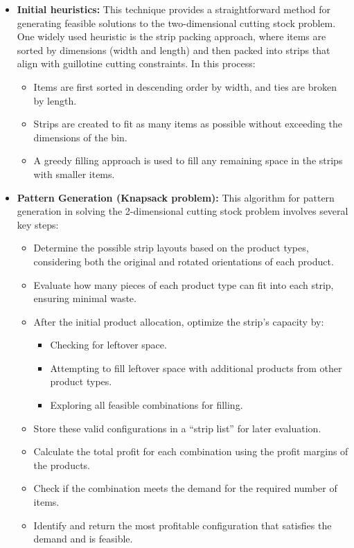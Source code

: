 \documentclass[a4paper]{article}
\begin{document}
\begin{itemize}
    \item \textbf{Initial heuristics:} This technique provides a straightforward method for generating feasible solutions to the two-dimensional cutting stock problem. One widely used heuristic is the strip packing approach, where items are sorted by dimensions (width and length) and then packed into strips that align with guillotine cutting constraints. In this process:
\begin{itemize}     
    \item Items are first sorted in descending order by width, and ties are broken by length.     
    \item Strips are created to fit as many items as possible without exceeding the dimensions of the bin.      
    \item A greedy filling approach is used to fill any remaining space in the strips with smaller items. 
\end{itemize}
\item \textbf{Pattern Generation (Knapsack problem): }
This algorithm for pattern generation in solving the 2-dimensional cutting stock problem involves several key steps:
\begin{itemize}
    \item Determine the possible strip layouts based on the product types, considering both the original and rotated orientations of each product.
    \item Evaluate how many pieces of each product type can fit into each strip, ensuring minimal waste.
    \item After the initial product allocation, optimize the strip’s capacity by:
    \begin{itemize}
        \item Checking for leftover space.
        \item Attempting to fill leftover space with additional products from other product types.
        \item Exploring all feasible combinations for filling.
    \end{itemize}
    \item Store these valid configurations in a ``strip list'' for later evaluation.
    \item Calculate the total profit for each combination using the profit margins of the products.
    \item Check if the combination meets the demand for the required number of items.
    \item Identify and return the most profitable configuration that satisfies the demand and is feasible.
    

\end{itemize}
\end{itemize}
\end{document}
